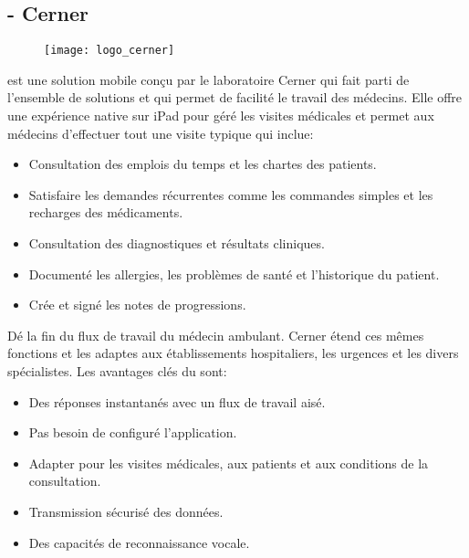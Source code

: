 \subsection{\pct{} - Cerner}

\begin{figure}[H]
\centering
\texttt{[image: logo\_cerner]}
\end{figure}

\pct{} est une solution mobile conçu par le laboratoire Cerner qui
fait parti de l'ensemble de solutions  et qui permet de
facilité le travail des médecins. Elle offre une expérience native
sur iPad pour géré les visites médicales et permet aux médecins
d'effectuer tout une visite typique qui inclue:~\cite{pct:flyer}

\begin{itemize}

\item Consultation des emplois du temps et les chartes des patients.

\item Satisfaire les demandes récurrentes comme les commandes simples
et les recharges des médicaments.

\item Consultation des diagnostiques et résultats cliniques.

\item Documenté les allergies, les problèmes de santé et l'historique
du patient.

\item Crée et signé les notes de progressions.

\end{itemize}

Dé la fin du flux de travail du médecin ambulant. Cerner étend ces
mêmes fonctions et les adaptes aux établissements hospitaliers, les
urgences et les divers spécialistes.
Les avantages clés du \pct{} sont:~\cite{pct:flyer}

\begin{itemize}

\item Des réponses instantanés avec un flux de travail aisé.

\item Pas besoin de configuré l'application.

\item Adapter pour les visites médicales, aux patients et aux conditions
de la consultation.

\item Transmission sécurisé des données.

\item Des capacités de reconnaissance vocale.

\end{itemize}

